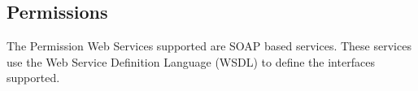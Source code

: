 \documentclass[letterpaper,10pt,english]{sphinxmanual}
\begin{document}
\subsection{Permissions}
\label{\detokenize{soapapi:permissions}}
The Permission Web Services supported are SOAP based services. These services use the Web Service Definition Language (WSDL) to define the interfaces supported.


\begin{sphinxVerbatim}[commandchars=\\\{\}]
\end{sphinxVerbatim}

\end{document}
